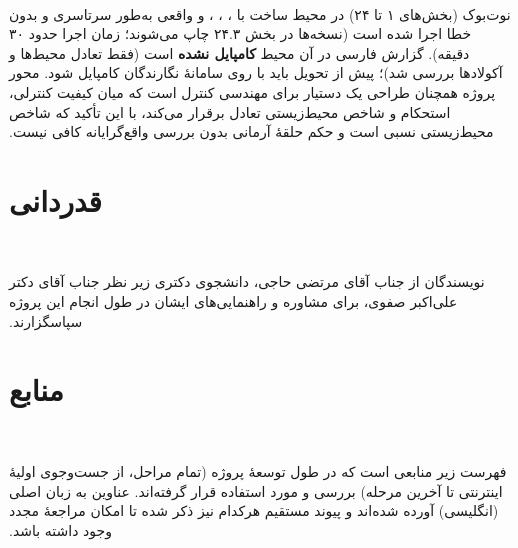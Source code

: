 ‫\documentclass[a4paper,12pt]{article}
\begin{document}
‫نوت‌بوک (بخش‌های ۱ تا ۲۴) در محیط ساخت با ، ، ،  و  واقعی به‌طور سرتاسری و بدون خطا اجرا شده است (نسخه‌ها در بخش ۲۴.۳ چاپ می‌شوند؛ زمان اجرا حدود ۳۰ دقیقه). گزارش  فارسی در آن محیط \textbf{کامپایل نشده} است (فقط تعادل محیط‌ها و آکولادها بررسی شد)؛ پیش از تحویل باید با  روی سامانهٔ نگارندگان کامپایل شود. محور پروژه همچنان طراحی یک دستیار برای مهندسی کنترل است که میان کیفیت کنترلی، استحکام و شاخص محیط‌زیستی تعادل برقرار می‌کند، با این تأکید که شاخص محیط‌زیستی نسبی است و حکم حلقهٔ آرمانی بدون بررسی واقع‌گرایانه کافی نیست.
‫
‫
‫\section*{قدردانی}
‫
‫نویسندگان از جناب آقای مرتضی حاجی، دانشجوی دکتری زیر نظر جناب آقای دکتر علی‌اکبر صفوی، برای مشاوره و راهنمایی‌های ایشان در طول انجام این پروژه سپاسگزارند.
‫
‫\section*{منابع}
‫
‫فهرست زیر منابعی است که در طول توسعهٔ پروژه (تمام مراحل، از جست‌وجوی
‫اولیهٔ اینترنتی تا آخرین مرحله) بررسی و مورد استفاده قرار گرفته‌اند.
‫عناوین به زبان اصلی (انگلیسی) آورده شده‌اند و پیوند مستقیم هرکدام نیز
‫ذکر شده تا امکان مراجعهٔ مجدد وجود داشته باشد.
‫
\end{document}
